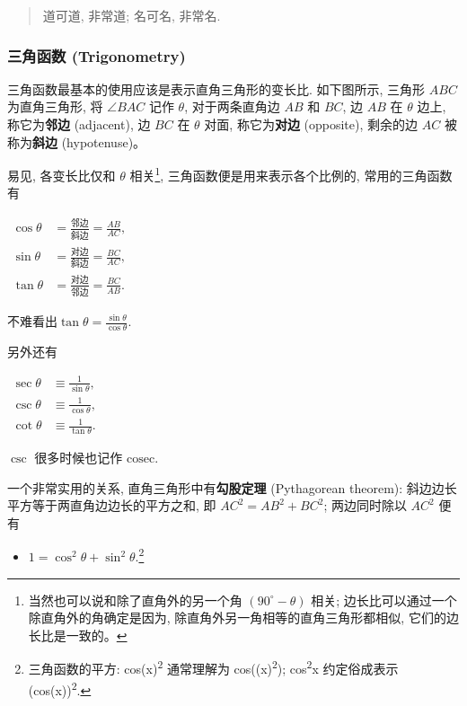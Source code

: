 \begin{quote}
道可道, 非常道; 名可名, 非常名.
\end{quote}

\hypertarget{ux4e09ux89d2ux51fdux6570-trigonometry}{%
\subsubsection{三角函数
(Trigonometry)}\label{ux4e09ux89d2ux51fdux6570-trigonometry}}

三角函数最基本的使用应该是表示直角三角形的变长比. 如下图所示, 三角形
\(ABC\) 为直角三角形, 将 \(\angle BAC\) 记作 \(\theta\), 对于两条直角边
\(AB\) 和 \(BC\), 边 \(AB\) 在 \(\theta\) 边上, 称它为\textbf{邻边}
(adjacent), 边 \(BC\) 在 \(\theta\) 对面, 称它为\textbf{对边}
(opposite), 剩余的边 \(AC\) 被称为\textbf{斜边} (hypotenuse)。

易见, 各变长比仅和 \(\theta\) 相关\footnote{当然也可以说和除了直角外的另一个角
  \((90^\circ-\theta)\) 相关; 边长比可以通过一个除直角外的角确定是因为,
  除直角外另一角相等的直角三角形都相似, 它们的边长比是一致的。},
三角函数便是用来表示各个比例的, 常用的三角函数有

\(\begin{aligned}\cos\theta&=\frac{邻边}{斜边}=\frac{AB}{AC},\\ \sin\theta&=\frac{对边}{斜边}=\frac{BC}{AC},\\ \tan\theta&=\frac{对边}{邻边}=\frac{BC}{AB}.\end{aligned}\)

不难看出\(\tan\theta=\frac{\sin\theta}{\cos\theta}\).

另外还有

\(\begin{aligned}\sec\theta&\equiv\frac{1}{\sin\theta},\\ \csc\theta&\equiv\frac{1}{\cos\theta},\\ \cot\theta&\equiv\frac{1}{\tan\theta}.\end{aligned}\)

\(\csc\) 很多时候也记作 \(\text{cosec}\).

一个非常实用的关系, 直角三角形中有\textbf{勾股定理} (Pythagorean
theorem): 斜边边长平方等于两直角边边长的平方之和, 即 \(AC^2=AB^2+BC^2\);
两边同时除以 \(AC^2\) 便有

\begin{itemize}
\tightlist
\item
  \(\boxed{1=\cos^2\theta+\sin^2\theta}\).\footnote{三角函数的平方:
    cos(x)\textsuperscript{2} 通常理解为 cos((x)\textsuperscript{2});
    cos\textsuperscript{2}x 约定俗成表示 (cos(x))\textsuperscript{2}.}
\end{itemize}

